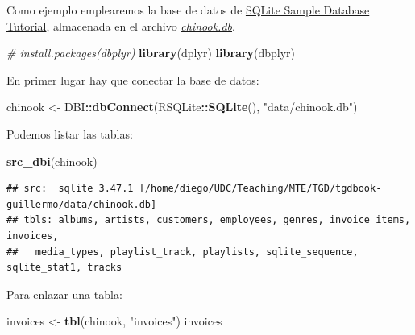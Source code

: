 \documentclass[
]{book}
\newenvironment{Shaded}{\begin{snugshade}}{\end{snugshade}}
\newcommand{\CommentTok}[1]{\textcolor[rgb]{0.56,0.35,0.01}{\textit{#1}}}
\newcommand{\FunctionTok}[1]{\textcolor[rgb]{0.13,0.29,0.53}{\textbf{#1}}}
\newcommand{\NormalTok}[1]{#1}
\newcommand{\OtherTok}[1]{\textcolor[rgb]{0.56,0.35,0.01}{#1}}
\newcommand{\SpecialCharTok}[1]{\textcolor[rgb]{0.81,0.36,0.00}{\textbf{#1}}}
\newcommand{\StringTok}[1]{\textcolor[rgb]{0.31,0.60,0.02}{#1}}
\begin{document}
Como ejemplo emplearemos la base de datos de \href{https://www.sqlitetutorial.net/sqlite-sample-database/}{SQLite Sample Database Tutorial}, almacenada en el archivo \href{data/chinook.db}{\emph{chinook.db}}.

\begin{Shaded}
\begin{Highlighting}[]
\CommentTok{\# install.packages(\textquotesingle{}dbplyr\textquotesingle{})}
\FunctionTok{library}\NormalTok{(dplyr)}
\FunctionTok{library}\NormalTok{(dbplyr)}
\end{Highlighting}
\end{Shaded}

En primer lugar hay que conectar la base de datos:

\begin{Shaded}
\begin{Highlighting}[]
\NormalTok{chinook }\OtherTok{\textless{}{-}}\NormalTok{ DBI}\SpecialCharTok{::}\FunctionTok{dbConnect}\NormalTok{(RSQLite}\SpecialCharTok{::}\FunctionTok{SQLite}\NormalTok{(), }\StringTok{"data/chinook.db"}\NormalTok{)}
\end{Highlighting}
\end{Shaded}

Podemos listar las tablas:

\begin{Shaded}
\begin{Highlighting}[]
\FunctionTok{src\_dbi}\NormalTok{(chinook)}
\end{Highlighting}
\end{Shaded}

\begin{verbatim}
## src:  sqlite 3.47.1 [/home/diego/UDC/Teaching/MTE/TGD/tgdbook-guillermo/data/chinook.db]
## tbls: albums, artists, customers, employees, genres, invoice_items, invoices,
##   media_types, playlist_track, playlists, sqlite_sequence, sqlite_stat1, tracks
\end{verbatim}

Para enlazar una tabla:

\begin{Shaded}
\begin{Highlighting}[]
\NormalTok{invoices }\OtherTok{\textless{}{-}} \FunctionTok{tbl}\NormalTok{(chinook, }\StringTok{"invoices"}\NormalTok{)}
\NormalTok{invoices}
\end{Highlighting}
\end{Shaded}
\end{document}
